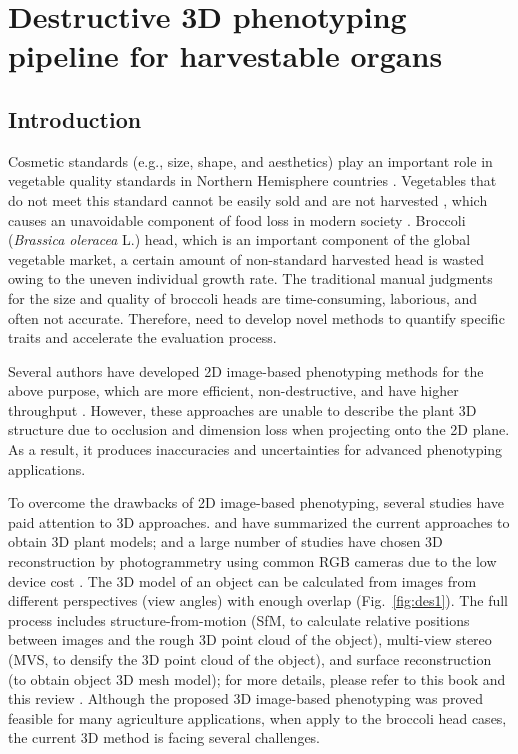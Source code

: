 \chapter{Destructive 3D phenotyping pipeline for harvestable organs}

\section{Introduction}

Cosmetic standards (e.g., size, shape, and aesthetics) play an important role in vegetable quality standards in Northern Hemisphere countries \citep{porter_avoidable_2018}. Vegetables that do not meet this standard cannot be easily sold and are not harvested \citep{garrone_opening_2014}, which causes an unavoidable component of food loss in modern society \citep{parfitt_food_2010,teuber_food_2016}. Broccoli (\textit{Brassica oleracea} L.) head, which is an important component of the global vegetable market, a certain amount of non-standard harvested head is wasted owing to the uneven individual growth rate. The traditional manual judgments for the size and quality of broccoli heads are time-consuming, laborious, and often not accurate. Therefore, need to develop novel methods to quantify specific traits and accelerate the evaluation process.

Several authors have developed 2D image-based phenotyping methods for the above purpose, which are more efficient, non-destructive, and have higher throughput \citep{yang_greenness_2015,guo_easypcc_2017,zou_broccoli_2019}. However, these approaches are unable to describe the plant 3D structure due to occlusion and dimension loss when projecting onto the 2D plane. As a result, it produces inaccuracies and uncertainties for advanced phenotyping applications.

To overcome the drawbacks of 2D image-based phenotyping, several studies have paid attention to 3D approaches. \citet{paulus_measuring_2019} and \citet{kochi_introduction_2021} have summarized the current approaches to obtain 3D plant models; and a large number of studies have chosen 3D reconstruction by photogrammetry using common \acrfull{RGB} cameras due to the low device cost \citep{xiao_estimating_2021,zermas_3d_2020,zhang_estimating_2016}. The 3D model of an object can be calculated from images from different perspectives (view angles) with enough overlap (Fig.~\ref{fig:des1}). The full process includes structure-from-motion (SfM, to calculate relative positions between images and the rough 3D point cloud of the object), multi-view stereo (MVS, to densify the 3D point cloud of the object), and surface reconstruction (to obtain object 3D mesh model); for more details, please refer to this book \citep{hartley_multiple_2000} and this review \citep{snavely_scene_2010}. Although the proposed 3D image-based phenotyping was proved feasible for many agriculture applications, when apply to the broccoli head cases, the current 3D method is facing several challenges.

